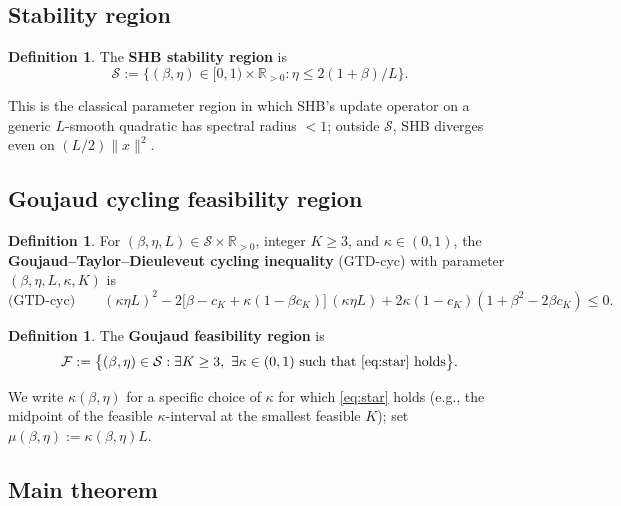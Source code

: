 \documentclass[11pt,a4paper]{article}
\theoremstyle{plain}
\theoremstyle{definition}
\newtheorem{definition}[theorem]{Definition}
\theoremstyle{remark}
\newcommand{\R}{\mathbb{R}}
\newcommand{\F}{\mathcal{F}}
\newcommand{\Sset}{\mathcal{S}}
\begin{document}
\subsection{Stability region}

\begin{definition}
The \textbf{SHB stability region} is
\[
\Sset := \{(\beta, \eta) \in [0,1) \times \R_{>0} : \eta \leq 2(1 + \beta)/L\}.
\]
\end{definition}

This is the classical parameter region in which SHB's update operator on a generic $L$-smooth quadratic has spectral radius $< 1$; outside $\Sset$, SHB diverges even on $(L/2)\|x\|^2$.

\subsection{Goujaud cycling feasibility region}

\begin{definition}
For $(\beta, \eta, L) \in \Sset \times \R_{>0}$, integer $K \geq 3$, and $\kappa \in (0, 1)$, the \textbf{Goujaud--Taylor--Dieuleveut cycling inequality} (GTD-cyc) with parameter $(\beta, \eta, L, \kappa, K)$ is
\begin{equation}
\text{(GTD-cyc)}\qquad (\kappa \eta L)^2 - 2\big[\beta - c_K + \kappa(1 - \beta c_K)\big]\,(\kappa \eta L) + 2\kappa(1 - c_K)(1 + \beta^2 - 2\beta c_K) \leq 0.\tag{$\star$}\label{eq:star}
\end{equation}
\end{definition}

\begin{definition}
The \textbf{Goujaud feasibility region} is
\[
\F := \big\{(\beta,\eta) \in \Sset : \exists K \geq 3,\ \exists \kappa \in (0,1)\ \text{such that \eqref{eq:star} holds}\big\}.
\]
\end{definition}

We write $\kappa(\beta,\eta)$ for a specific choice of $\kappa$ for which \eqref{eq:star} holds (e.g., the midpoint of the feasible $\kappa$-interval at the smallest feasible $K$); set $\mu(\beta,\eta) := \kappa(\beta,\eta) L$.

\subsection{Main theorem}
\end{document}

